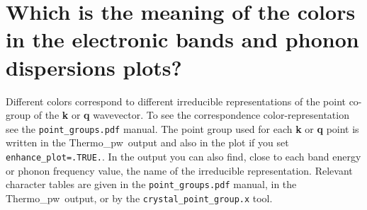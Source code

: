 \documentclass[12pt,a4paper,twoside]{report}
\def\thermo{{\sc Thermo}\_{\sc pw}}
\begin{document}
\newpage
{\color{coral}\section{Which is the meaning of the colors in
the electronic bands and phonon dispersions plots?}}
\color{black}
Different colors correspond to different irreducible representations of 
the point co-group of the {\bf k} or {\bf q} wavevector. To see the
correspondence color-representation see the \texttt{point\_groups.pdf} 
manual. The point group used for each {\bf k} or {\bf q} point is
written in the \thermo\ output and also in the plot if you set
\texttt{enhance\_plot=.TRUE.}. In the output you can also find,
close to each band energy or phonon frequency value, the name of the
irreducible representation. Relevant character tables are given in the
\texttt{point\_groups.pdf} manual, in the \thermo\ output, or by the
\texttt{crystal\_point\_group.x} tool.
\end{document}
